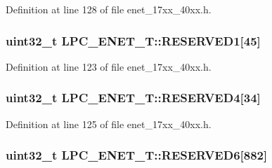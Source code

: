 Definition at line 128 of file enet\+\_\+17xx\+\_\+40xx.\+h.

\subsubsection[{\texorpdfstring{R\+E\+S\+E\+R\+V\+E\+D1}{RESERVED1}}]{\setlength{\rightskip}{0pt plus 5cm}uint32\+\_\+t L\+P\+C\+\_\+\+E\+N\+E\+T\+\_\+\+T\+::\+R\+E\+S\+E\+R\+V\+E\+D1\mbox{[}45\mbox{]}}\hypertarget{structLPC__ENET__T_a5dd6bf9f10045f3599a60d157f38598b}{}\label{structLPC__ENET__T_a5dd6bf9f10045f3599a60d157f38598b}


Definition at line 123 of file enet\+\_\+17xx\+\_\+40xx.\+h.

\subsubsection[{\texorpdfstring{R\+E\+S\+E\+R\+V\+E\+D4}{RESERVED4}}]{\setlength{\rightskip}{0pt plus 5cm}uint32\+\_\+t L\+P\+C\+\_\+\+E\+N\+E\+T\+\_\+\+T\+::\+R\+E\+S\+E\+R\+V\+E\+D4\mbox{[}34\mbox{]}}\hypertarget{structLPC__ENET__T_a21834684d9ccdf758a76d847fce309d1}{}\label{structLPC__ENET__T_a21834684d9ccdf758a76d847fce309d1}


Definition at line 125 of file enet\+\_\+17xx\+\_\+40xx.\+h.

\subsubsection[{\texorpdfstring{R\+E\+S\+E\+R\+V\+E\+D6}{RESERVED6}}]{\setlength{\rightskip}{0pt plus 5cm}uint32\+\_\+t L\+P\+C\+\_\+\+E\+N\+E\+T\+\_\+\+T\+::\+R\+E\+S\+E\+R\+V\+E\+D6\mbox{[}882\mbox{]}}\hypertarget{structLPC__ENET__T_a69971bdb50272af4d797c243b68a640a}{}\label{structLPC__ENET__T_a69971bdb50272af4d797c243b68a640a}


